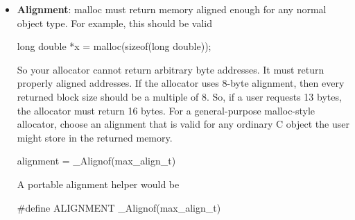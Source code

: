 \documentclass{report}
\begin{document}
\begin{itemize}
                \bigbreak \noindent 
                Values must be an integral constant expression that evaluates to zero or a power of 2 (e.g., 1, 2, 4, 8, 16). If multiple alignas specifiers are applied, the compiler respects the largest value.
                \bigbreak \noindent 
                In C, it was introduced as \_Alignas (in C11). As of C23, it is available as the alignas keyword.
                \bigbreak \noindent 
                \begin{cppcode}
                alignas(8) int my_variable;
                \end{cppcode}
                \bigbreak \noindent 
                 If the type naturally requires a larger alignment (e.g., a hardware type demanding 8 bytes), using alignas(4) is ignored.
            \item \textbf{Alignment}: malloc must return memory aligned enough for any normal object type. For example, this should be valid
                \bigbreak \noindent 
                \begin{cppcode}
                long double *x = malloc(sizeof(long double));
                \end{cppcode}
                \bigbreak \noindent 
                So your allocator cannot return arbitrary byte addresses. It must return properly aligned addresses.
                \bigbreak \noindent 
                If the allocator uses 8-byte alignment, then every returned block size should be a multiple of 8. So, if a user requests 13 bytes, the allocator must return 16 bytes.
                \bigbreak \noindent 
                For a general-purpose malloc-style allocator, choose an alignment that is valid for any ordinary C object the user might store in the returned memory.
                \bigbreak \noindent 
                \begin{cppcode}
                alignment = _Alignof(max_align_t)
                \end{cppcode}
                \bigbreak \noindent 
                A portable alignment helper would be 
                \bigbreak \noindent 
                \begin{cppcode}
                #define ALIGNMENT _Alignof(max_align_t)


\end{cppcode}
\end{itemize}
\end{document}
